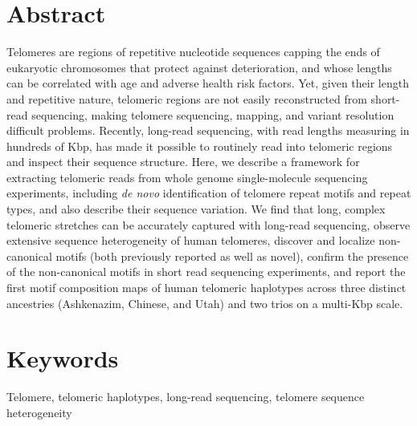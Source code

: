 \documentclass{article}
\begin{document}
\section*{Abstract} 
    Telomeres are regions of repetitive nucleotide sequences capping the ends of eukaryotic chromosomes that protect against deterioration,
        and whose lengths can be correlated with age and adverse health risk factors.
    Yet, given their length and repetitive nature,
        telomeric regions are not easily reconstructed from short-read sequencing,
        making telomere sequencing, mapping, and variant resolution difficult problems.
    Recently, long-read sequencing, with read lengths measuring in hundreds of Kbp,
        has made it possible to routinely read into telomeric regions and inspect their sequence structure.
    Here, we describe a framework for
        extracting telomeric reads from whole genome single-molecule sequencing experiments,
        including \textit{de novo} identification of telomere repeat motifs and repeat types,
        and also describe their sequence variation.
    We find that
        long, complex telomeric stretches can be accurately captured with long-read sequencing,
        observe extensive sequence heterogeneity of human telomeres,
        discover and localize non-canonical motifs (both previously reported as well as novel),
        confirm the presence of the non-canonical motifs in short read sequencing experiments,
        and report the first motif composition maps of human telomeric haplotypes across three distinct ancestries
            (Ashkenazim, Chinese, and Utah) and two trios on a multi-Kbp scale.

\section*{Keywords} 
    Telomere, telomeric haplotypes, long-read sequencing, telomere sequence heterogeneity

\pagebreak
\doublespacing
\end{document}
